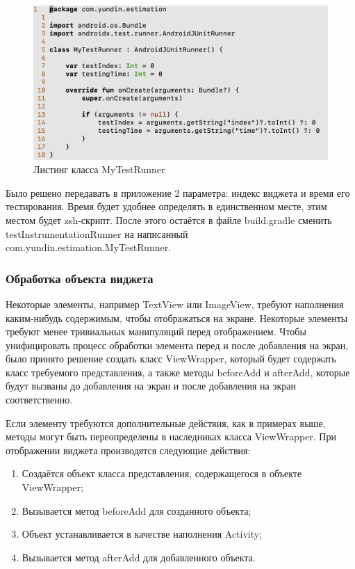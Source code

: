 \documentclass[a4paper,14pt]{extarticle} %
\begin{document}
	\begin{figure}[tbh]
		\includegraphics[width=\textwidth]{mytestrunner}
		\caption{Листинг класса MyTestRunner}
		\label{fig:mytestrunner}
	\end{figure}
	
	Было решено передавать в приложение 2 параметра: индекс виджета и время его тестирования. Время будет удобнее определять в единственном месте, этим местом будет zsh-скрипт. После этого остаётся в файле build.gradle сменить testInstrumentationRunner на написанный com.yundin.estimation.MyTestRunner.
	
	\subsubsection{Обработка объекта виджета}
	
	Некоторые элементы, например TextView или ImageView, требуют наполнения каким-нибудь содержимым, чтобы отображаться на экране. Некоторые элементы требуют менее тривиальных манипуляций перед отображением. Чтобы унифицировать процесс обработки элемента перед и после добавления на экран, было принято решение создать класс ViewWrapper, который будет содержать класс требуемого представления, а также методы beforeAdd и afterAdd, которые будут вызваны до добавления на экран и после добавления на экран соответственно.
	
	Если элементу требуются дополнительные действия, как в примерах выше, методы могут быть переопределены в наследниках класса ViewWrapper. При отображении виджета производятся следующие действия:
	\begin{enumerate}
		\item Создаётся объект класса представления, содержащегося в объекте ViewWrapper;
		\item Вызывается метод beforeAdd для созданного объекта;
		\item Объект устанавливается в качестве наполнения Activity;
		\item Вызывается метод afterAdd для добавленного объекта.
	\end{enumerate}
\end{document}
